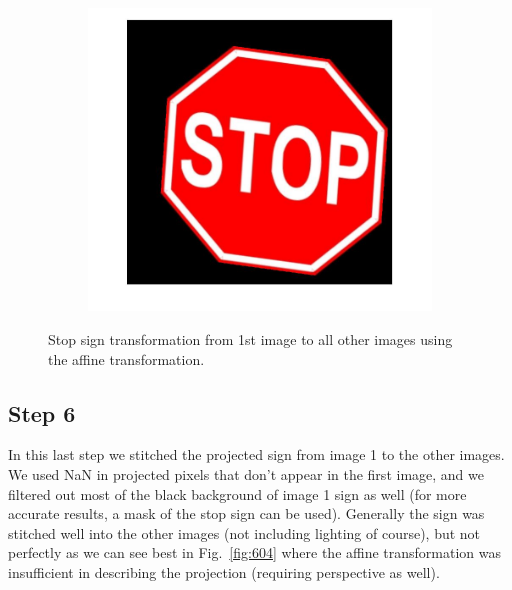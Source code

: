\documentclass[a4paper]{iacas}
\begin{document}
\begin{figure}[!htbp]
\begin{subfigure}[b]{0.32\textwidth}
		\includegraphics[width=\textwidth]{504.jpg}
		\caption{}
		\label{fig:504}
	\end{subfigure}
	
	\caption{Stop sign transformation from 1st image to all other images using the affine transformation.}
	\label{fig:500}
\end{figure}

\subsection{Step 6}

In this last step we stitched the projected sign from image 1 to the other images. We used NaN in projected pixels that don't appear in the first image, and we filtered out most of the black background of image 1 sign as well (for more accurate results, a mask of the stop sign can be used). Generally the sign was stitched well into the other images (not including lighting of course), but not perfectly as we can see best in Fig.~\ref{fig:604} where the affine transformation was insufficient in describing the projection (requiring perspective as well).
\end{document}
